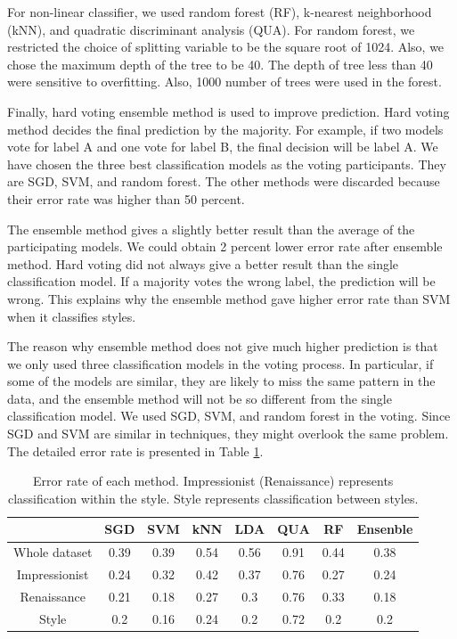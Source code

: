 \documentclass[11pt,a4paper]{article}
\begin{document}
For non-linear classifier, we used random forest (RF), k-nearest neighborhood (kNN), and quadratic discriminant analysis (QUA). For random forest, we restricted the choice of splitting variable to be the square root of 1024. Also, we chose the maximum depth of the tree to be 40. The depth of tree less than 40 were sensitive to overfitting. Also, 1000 number of trees were used in the forest.

Finally, hard voting ensemble method is used to improve prediction. Hard voting method decides the final prediction by the majority. For example, if two models vote for label A and one vote for label B, the final decision will be label A. We have chosen the three best classification models as the voting participants. They are SGD, SVM, and random forest. The other methods were discarded because their error rate was higher than 50 percent.

The ensemble method gives a slightly better result than the average of the participating models. We could obtain 2 percent lower error rate after ensemble method. Hard voting did not always give a better result than the single classification model. If a majority votes the wrong label, the prediction will be wrong. This explains why the ensemble method gave higher error rate than SVM when it classifies styles.

The reason why ensemble method does not give much higher prediction is that we only used three classification models in the voting process. In particular, if some of the models are similar, they are likely to miss the same pattern in the data, and the ensemble method will not be so different from the single classification model. We used SGD, SVM, and random forest in the voting. Since SGD and SVM are similar in techniques, they might overlook the same problem. The detailed error rate is presented in Table \ref{table1}.

\begin{table}[]
    \centering
    \begin{tabular}{ |c|c|c|c|c|c|c|c| } 
         \hline
          & SGD & SVM & kNN & LDA & QUA & RF & Ensenble \\ 
          \hline
         Whole dataset & 0.39 & 0.39 & 0.54 & 0.56 & 0.91 & 0.44 & 0.38 \\ 
         Impressionist & 0.24 & 0.32 & 0.42 & 0.37 & 0.76 & 0.27  & 0.24 \\ 
         Renaissance & 0.21 & 0.18 & 0.27 & 0.3 & 0.76 & 0.33 & 0.18 \\
         Style & 0.2 & 0.16 & 0.24 & 0.2 & 0.72 & 0.2 & 0.2 \\
         \hline
     \end{tabular}
    \caption{Error rate of each method. Impressionist (Renaissance) represents classification within the style. Style represents classification between styles.}
    \label{table1}
\end{table}
\end{document}

